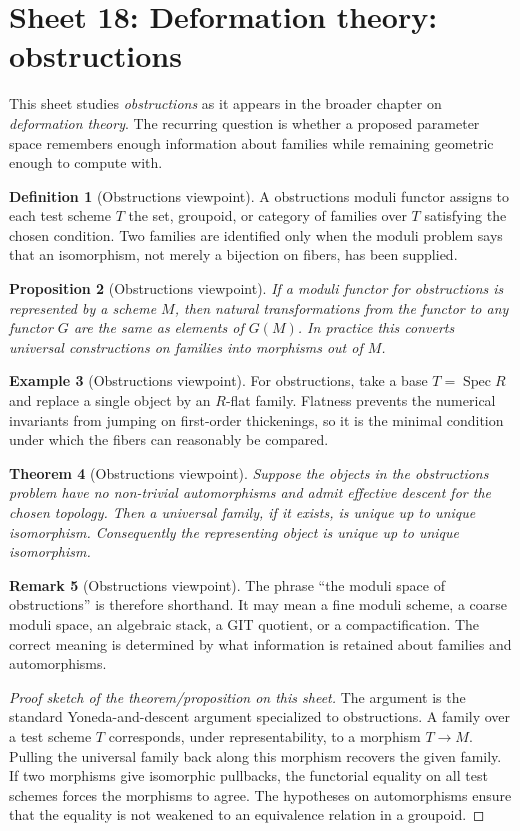 \documentclass[11pt]{amsart}
\newtheorem{theorem}{Theorem}[section]
\newtheorem{proposition}[theorem]{Proposition}
\theoremstyle{definition}
\newtheorem{definition}[theorem]{Definition}
\newtheorem{example}[theorem]{Example}
\newtheorem{remark}[theorem]{Remark}
\newcommand{\Spec}{\operatorname{Spec}}
\begin{document}
\section{Sheet 18: Deformation theory: obstructions}
This sheet studies \emph{obstructions} as it appears in the broader chapter on \emph{deformation theory}.  The recurring question is whether a proposed parameter space remembers enough information about families while remaining geometric enough to compute with.
\begin{definition}[Obstructions viewpoint]
A obstructions moduli functor assigns to each test scheme $T$ the set, groupoid, or category of families over $T$ satisfying the chosen condition.  Two families are identified only when the moduli problem says that an isomorphism, not merely a bijection on fibers, has been supplied.
\end{definition}
\begin{proposition}[Obstructions viewpoint]
If a moduli functor for obstructions is represented by a scheme $M$, then natural transformations from the functor to any functor $G$ are the same as elements of $G(M)$.  In practice this converts universal constructions on families into morphisms out of $M$.
\end{proposition}
\begin{example}[Obstructions viewpoint]
For obstructions, take a base $T=\Spec R$ and replace a single object by an $R$-flat family.  Flatness prevents the numerical invariants from jumping on first-order thickenings, so it is the minimal condition under which the fibers can reasonably be compared.
\end{example}
\begin{theorem}[Obstructions viewpoint]
Suppose the objects in the obstructions problem have no non-trivial automorphisms and admit effective descent for the chosen topology.  Then a universal family, if it exists, is unique up to unique isomorphism.  Consequently the representing object is unique up to unique isomorphism.
\end{theorem}
\begin{remark}[Obstructions viewpoint]
The phrase ``the moduli space of obstructions'' is therefore shorthand.  It may mean a fine moduli scheme, a coarse moduli space, an algebraic stack, a GIT quotient, or a compactification.  The correct meaning is determined by what information is retained about families and automorphisms.
\end{remark}
\begin{proof}[Proof sketch of the theorem/proposition on this sheet]
The argument is the standard Yoneda-and-descent argument specialized to obstructions.  A family over a test scheme $T$ corresponds, under representability, to a morphism $T\to M$.  Pulling the universal family back along this morphism recovers the given family.  If two morphisms give isomorphic pullbacks, the functorial equality on all test schemes forces the morphisms to agree.  The hypotheses on automorphisms ensure that the equality is not weakened to an equivalence relation in a groupoid.
\end{proof}
\end{document}
